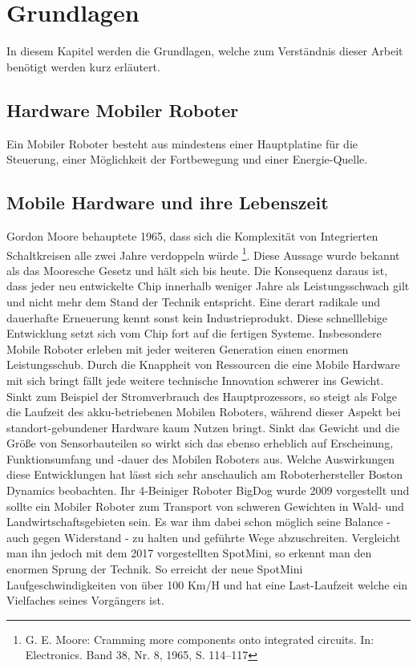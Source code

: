 \documentclass[a4paper,cleardoubleempty,BCOR1cm]{book}
\begin{document}
\chapter{Grundlagen}
In diesem Kapitel werden die Grundlagen, welche zum Verständnis dieser Arbeit benötigt werden kurz erläutert.

\section{Hardware Mobiler Roboter}
Ein Mobiler Roboter besteht aus mindestens einer Hauptplatine für die Steuerung, einer Möglichkeit der Fortbewegung und einer Energie-Quelle. \\


\section{Mobile Hardware und ihre Lebenszeit}
Gordon Moore behauptete 1965, dass sich die Komplexität von Integrierten Schaltkreisen alle zwei Jahre verdoppeln würde \footnote{ G. E. Moore: Cramming more components onto integrated circuits. In: Electronics. Band 38, Nr. 8, 1965, S. 114–117}. Diese Aussage wurde bekannt als das Mooresche Gesetz und hält sich bis heute. Die Konsequenz daraus ist, dass jeder neu entwickelte Chip innerhalb weniger Jahre als Leistungsschwach gilt und nicht mehr dem Stand der Technik entspricht. Eine derart radikale und dauerhafte Erneuerung kennt sonst kein Industrieprodukt. Diese schnelllebige Entwicklung setzt sich vom Chip fort auf die fertigen Systeme. Insbesondere Mobile Roboter erleben mit jeder weiteren Generation einen enormen Leistungsschub. Durch die Knappheit von Ressourcen die eine Mobile Hardware mit sich bringt fällt jede weitere technische Innovation schwerer ins Gewicht. Sinkt zum Beispiel der Stromverbrauch des Hauptprozessors, so steigt als Folge die Laufzeit des akku-betriebenen Mobilen Roboters, während dieser Aspekt bei standort-gebundener Hardware kaum Nutzen bringt. Sinkt das Gewicht und die Größe von Sensorbauteilen so wirkt sich das ebenso erheblich auf Erscheinung, Funktionsumfang und -dauer des Mobilen Roboters aus. Welche Auswirkungen diese Entwicklungen hat lässt sich sehr anschaulich am Roboterhersteller Boston Dynamics beobachten. Ihr 4-Beiniger Roboter BigDog wurde 2009 vorgestellt und sollte ein Mobiler Roboter zum Transport von schweren Gewichten in Wald- und Landwirtschaftsgebieten sein. Es war ihm dabei schon möglich seine Balance - auch gegen Widerstand - zu halten und geführte Wege abzuschreiten. Vergleicht man ihn jedoch mit dem 2017 vorgestellten SpotMini, so erkennt man den enormen Sprung der Technik. So erreicht der neue SpotMini Laufgeschwindigkeiten von über 100 Km/H und hat eine Last-Laufzeit welche ein Vielfaches seines Vorgängers ist. \\
\end{document}
